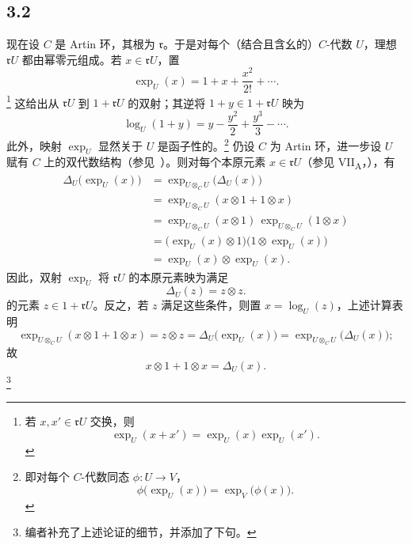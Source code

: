
\subsection*{3.2}
\label{sga3:VIIB:3.2}
现在设 \(C\) 是 Artin 环，其根为 \(\mathfrak r\)。于是对每个\textup{（结合且含幺的）}\(C\)-代数 \(U\)，理想 \(\mathfrak rU\) 都由幂零元组成。若 \(x\in\mathfrak rU\)，置
\[
  \exp_U(x)
  =
  1+x+\frac{x^2}{2!}+\cdots.
\]
\footnote{\label{sga3:VIIB:nde:119}若 \(x,x'\in\mathfrak rU\) 交换，则
\[
  \exp_U(x+x')=\exp_U(x)\exp_U(x').
\]
}
这给出从 \(\mathfrak rU\) 到 \(1+\mathfrak rU\) 的双射；其逆将 \(1+y\in1+\mathfrak rU\) 映为
\[
  \log_U(1+y)
  =
  y-\frac{y^2}{2}+\frac{y^3}{3}-\cdots.
\]
此外，映射 \(\exp_U\) 显然关于 \(U\) 是函子性的。\footnote{\label{sga3:VIIB:nde:120}即对每个 \(C\)-代数同态 \(\phi:U\to V\)，
\[
  \phi\bigl(\exp_U(x)\bigr)=\exp_V\bigl(\phi(x)\bigr).
\]
}
仍设 \(C\) 为 Artin 环，进一步设 \(U\) 赋有 \(C\) 上的双代数结构\textup{（参见\ ）}。则对每个本原元素 \(x\in\mathfrak rU\)\textup{（参见 VII\textsubscript{A}，）}，有
\[
\begin{aligned}
  \Delta_U\bigl(\exp_U(x)\bigr)
  &=
  \exp_{U\otimes_CU}\bigl(\Delta_U(x)\bigr)
  \\
  &=
  \exp_{U\otimes_CU}(x\otimes1+1\otimes x)
  \\
  &=
  \exp_{U\otimes_CU}(x\otimes1)\,
  \exp_{U\otimes_CU}(1\otimes x)
  \\
  &=
  \bigl(\exp_U(x)\otimes1\bigr)
  \bigl(1\otimes\exp_U(x)\bigr)
  \\
  &=
  \exp_U(x)\otimes\exp_U(x).
\end{aligned}
\]
因此，双射 \(\exp_U\) 将 \(\mathfrak rU\) 的本原元素映为满足
\[
  \Delta_U(z)=z\otimes z.
\]
的元素 \(z\in1+\mathfrak rU\)。反之，若 \(z\) 满足这些条件，则置 \(x=\log_U(z)\)，上述计算表明
\[
  \exp_{U\otimes_CU}(x\otimes1+1\otimes x)
  =
  z\otimes z
  =
  \Delta_U\bigl(\exp_U(x)\bigr)
  =
  \exp_{U\otimes_CU}\bigl(\Delta_U(x)\bigr);
\]
故
\[
  x\otimes1+1\otimes x=\Delta_U(x).
\]
\footnote{\label{sga3:VIIB:nde:121}编者补充了上述论证的细节，并添加了下句。}
